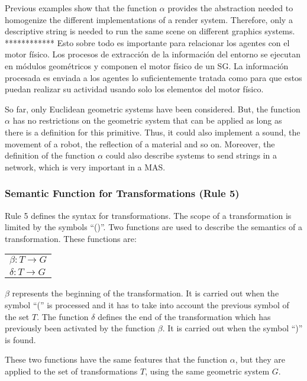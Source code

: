 \documentclass[runningheads]{llncs}
\begin{document}
Previous examples show that the function $\alpha$ provides the abstraction needed to homogenize the different implementations of a render system. Therefore, only a descriptive string is needed to run the same scene on different graphics systems. ************ Esto sobre todo es importante para relacionar los agentes con el motor físico. Los procesos de extracción de la información del entorno se ejecutan en módulos geométricos y componen el motor físico de un SG. La información procesada es enviada a los agentes lo suficientemente tratada como para que estos puedan realizar su actividad usando solo los elementos del motor físico.
	
So far, only Euclidean geometric systems have been considered. But, the function $\alpha$ has no
restrictions on the geometric system that can be applied as long as there is a definition for this
primitive. Thus, it could also implement a sound, the movement of a robot, the reflection of a
material and so on. Moreover, the definition of the function $\alpha$ could also describe systems
to send strings in a network, which is very important in a MAS.
	
	
\subsubsection{Semantic Function for Transformations (Rule 5)
\label{sec:rule5}}
	
Rule 5 defines the syntax for transformations. The scope of a transformation is
limited by the symbols ``()''. Two functions are used to describe the semantics
of a transformation. These functions are:

\begin{center}
\begin{tabular}{l}
    $\beta: T \rightarrow G$ \\
    $\delta: T \rightarrow G$
\end{tabular}
\end{center}

$\beta$ represents the beginning of the transformation. It is carried out when the symbol ``('' is
processed and it has to take into account the previous symbol of the set $T$. The function $\delta$
defines the end of the transformation which has previously been activated by the function $\beta$.
It is carried out when the symbol ``)'' is found.

These two functions have the same features that the function $\alpha$, but they
are applied to the set of transformations $T$, using the same geometric system
$G$.
\end{document}
